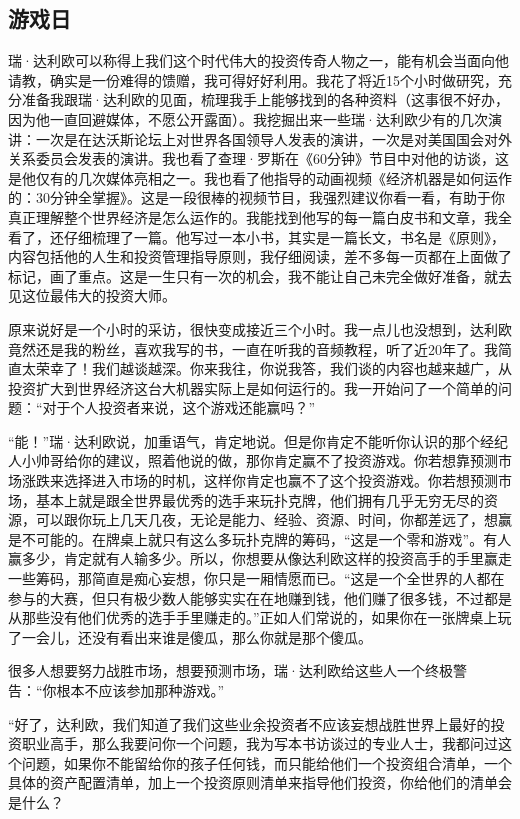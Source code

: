 \subsection{游戏日}

瑞·达利欧可以称得上我们这个时代伟大的投资传奇人物之一，能有机会当面向他请教，确实是一份难得的馈赠，我可得好好利用。我花了将近15个小时做研究，充分准备我跟瑞·达利欧的见面，梳理我手上能够找到的各种资料（这事很不好办，因为他一直回避媒体，不愿公开露面）。我挖掘出来一些瑞·达利欧少有的几次演讲：一次是在达沃斯论坛上对世界各国领导人发表的演讲，一次是对美国国会对外关系委员会发表的演讲。我也看了查理·罗斯在《60分钟》节目中对他的访谈，这是他仅有的几次媒体亮相之一。我也看了他指导的动画视频《经济机器是如何运作的：30分钟全掌握》。这是一段很棒的视频节目，我强烈建议你看一看，有助于你真正理解整个世界经济是怎么运作的。我能找到他写的每一篇白皮书和文章，我全看了，还仔细梳理了一篇。他写过一本小书，其实是一篇长文，书名是《原则》，内容包括他的人生和投资管理指导原则，我仔细阅读，差不多每一页都在上面做了标记，画了重点。这是一生只有一次的机会，我不能让自己未完全做好准备，就去见这位最伟大的投资大师。

原来说好是一个小时的采访，很快变成接近三个小时。我一点儿也没想到，达利欧竟然还是我的粉丝，喜欢我写的书，一直在听我的音频教程，听了近20年了。我简直太荣幸了！我们越谈越深。你来我往，你说我答，我们谈的内容也越来越广，从投资扩大到世界经济这台大机器实际上是如何运行的。我一开始问了一个简单的问题：“对于个人投资者来说，这个游戏还能赢吗？”

“能！”瑞·达利欧说，加重语气，肯定地说。但是你肯定不能听你认识的那个经纪人小帅哥给你的建议，照着他说的做，那你肯定赢不了投资游戏。你若想靠预测市场涨跌来选择进入市场的时机，这样你肯定也赢不了这个投资游戏。你若想预测市场，基本上就是跟全世界最优秀的选手来玩扑克牌，他们拥有几乎无穷无尽的资源，可以跟你玩上几天几夜，无论是能力、经验、资源、时间，你都差远了，想赢是不可能的。在牌桌上就只有这么多玩扑克牌的筹码，“这是一个零和游戏”。有人赢多少，肯定就有人输多少。所以，你想要从像达利欧这样的投资高手的手里赢走一些筹码，那简直是痴心妄想，你只是一厢情愿而已。“这是一个全世界的人都在参与的大赛，但只有极少数人能够实实在在地赚到钱，他们赚了很多钱，不过都是从那些没有他们优秀的选手手里赚走的。”正如人们常说的，如果你在一张牌桌上玩了一会儿，还没有看出来谁是傻瓜，那么你就是那个傻瓜。

很多人想要努力战胜市场，想要预测市场，瑞·达利欧给这些人一个终极警告：“你根本不应该参加那种游戏。”

“好了，达利欧，我们知道了我们这些业余投资者不应该妄想战胜世界上最好的投资职业高手，那么我要问你一个问题，我为写本书访谈过的专业人士，我都问过这个问题，如果你不能留给你的孩子任何钱，而只能给他们一个投资组合清单，一个具体的资产配置清单，加上一个投资原则清单来指导他们投资，你给他们的清单会是什么？

